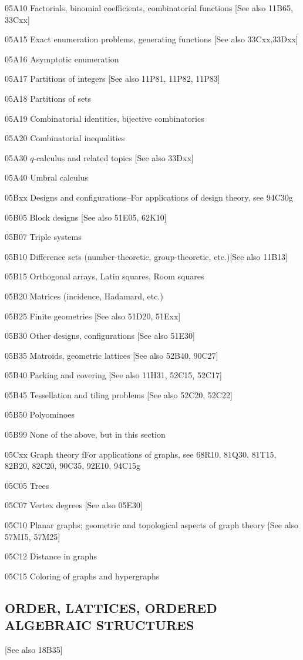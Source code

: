 \documentclass[12pt]{article}
\theoremstyle{plain}
\theoremstyle{definition}
\numberwithin{equation}{section}
\begin{document}
05A10 Factorials, binomial coefficients, combinatorial functions [See also 11B65, 33Cxx]

05A15 Exact enumeration problems, generating functions [See also 33Cxx,33Dxx]

05A16 Asymptotic enumeration

05A17 Partitions of integers [See also 11P81, 11P82, 11P83]

05A18 Partitions of sets

05A19 Combinatorial identities, bijective combinatorics

05A20 Combinatorial inequalities

05A30 $q$-calculus and related topics [See also 33Dxx]

05A40 Umbral calculus

05Bxx Designs and configurations--For applications of design theory,  see 94C30g

05B05 Block designs [See also 51E05, 62K10]

05B07 Triple systems

05B10 Difference sets (number-theoretic, group-theoretic, etc.)[See also 11B13]

05B15 Orthogonal arrays, Latin squares, Room squares

05B20 Matrices (incidence, Hadamard, etc.)

05B25 Finite geometries [See also 51D20, 51Exx]

05B30 Other designs, configurations [See also 51E30]

05B35 Matroids, geometric lattices [See also 52B40, 90C27]

05B40 Packing and covering [See also 11H31, 52C15, 52C17]

05B45 Tessellation and tiling problems [See also 52C20, 52C22]

05B50 Polyominoes

05B99 None of the above, but in this section

05Cxx Graph theory fFor applications of graphs, see 68R10, 81Q30, 81T15, 82B20, 82C20, 90C35, 92E10, 94C15g

05C05 Trees

05C07 Vertex degrees [See also 05E30]

05C10 Planar graphs; geometric and topological aspects of graph theory [See also 57M15, 57M25]

05C12 Distance in graphs

05C15 Coloring of graphs and hypergraphs


\subsection{ORDER, LATTICES, ORDERED ALGEBRAIC STRUCTURES}
[See also 18B35]
\end{document}
